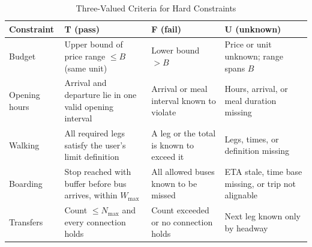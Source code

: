 \documentclass[conference]{IEEEtran}
\begin{document}
\begin{table}[t]
\centering
\caption{Three-Valued Criteria for Hard Constraints}
\label{tab:three_valued}
\footnotesize
\renewcommand{\arraystretch}{1.15}
\setlength{\tabcolsep}{3pt}
\begin{tabular}{@{}L{1.25cm}L{2.2cm}L{2.0cm}L{2.0cm}@{}}
\toprule
\textbf{Constraint} & \textbf{T (pass)} & \textbf{F (fail)} & \textbf{U (unknown)} \\
\midrule
Budget & Upper bound of price range $\le B$ (same unit) & Lower bound $> B$ & Price or unit unknown; range spans $B$ \\
Opening hours & Arrival and departure lie in one valid opening interval & Arrival or meal interval known to violate & Hours, arrival, or meal duration missing \\
Walking & All required legs satisfy the user's limit definition & A leg or the total is known to exceed it & Legs, times, or definition missing \\
Boarding & Stop reached with buffer before bus arrives, within $W_{\max}$ & All allowed buses known to be missed & ETA stale, time base missing, or trip not alignable \\
Transfers & Count $\le N_{\max}$ and every connection holds & Count exceeded or no connection holds & Next leg known only by headway \\
\bottomrule
\end{tabular}
\end{table}
\end{document}
